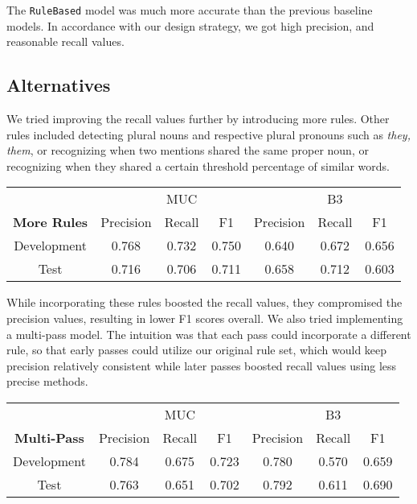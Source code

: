 \documentclass[12pt]{article}
\begin{document}
The \texttt{RuleBased} model was much more accurate than the previous baseline models. In accordance with our design strategy, we got high precision, and reasonable recall values. 

\subsection{Alternatives}
We tried improving the recall values further by introducing more rules. Other rules included detecting plural nouns and respective plural pronouns such as \emph{they, them}, or recognizing when two mentions shared the same proper noun, or recognizing when they shared a certain threshold percentage of similar words. 

\begin{table}[ht] 
\centering %
\begin{tabular}{c | c c c | c c c} 
& & MUC & & & B3 \\ [0.5ex] %
\textbf{More Rules} & Precision & Recall & F1 & Precision & Recall & F1 \\ [0.5ex] %
\hline %
Development & 0.768 & 0.732 & 0.750 & 0.640 & 0.672 & 0.656 \\
Test & 0.716 & 0.706 & 0.711 & 0.658 & 0.712 & 0.603\\
\end{tabular} 
\label{table:nonlin}
\end{table}

While incorporating these rules boosted the recall values, they compromised the precision values, resulting in lower F1 scores overall. We also tried implementing a multi-pass model. The intuition was that each pass could incorporate a different rule, so that early passes could utilize our original rule set, which would keep precision relatively consistent while later passes boosted recall values using less precise methods. 
\newpage
\begin{table}[ht] 
\centering %
\begin{tabular}{c | c c c | c c c} 
& & MUC & & & B3 \\ [0.5ex] %
\textbf{Multi-Pass} & Precision & Recall & F1 & Precision & Recall & F1 \\ [0.5ex] %
\hline %
Development & 0.784 & 0.675 & 0.723 & 0.780 & 0.570 & 0.659 \\
Test & 0.763 & 0.651 & 0.702 & 0.792 & 0.611 & 0.690\\
\end{tabular} 
\label{table:nonlin2}
\end{table}
\end{document}
